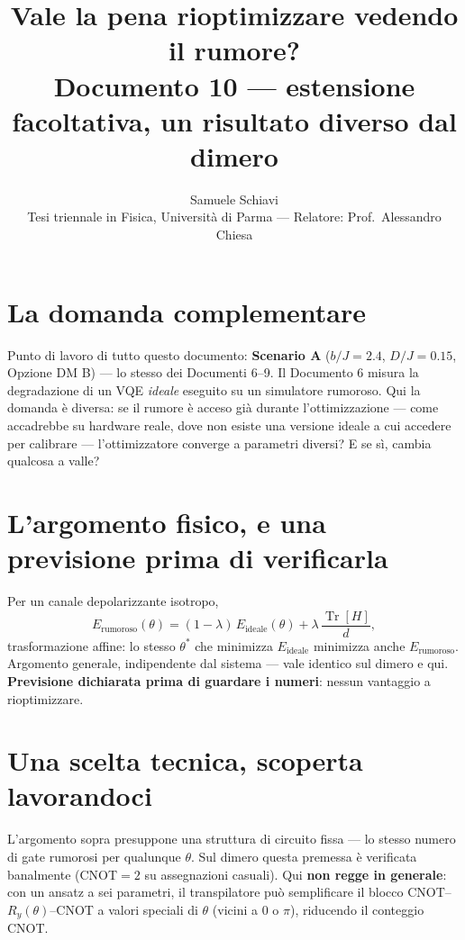 \documentclass[11pt,a4paper]{article}
\title{\bfseries Vale la pena rioptimizzare vedendo il rumore?\\[2pt]
\large Documento 10 --- estensione facoltativa, un risultato diverso dal dimero}
\author{Samuele Schiavi \\ \small Tesi triennale in Fisica, Università di Parma
--- Relatore: Prof.\ Alessandro Chiesa}
\date{}
\providecommand{\Tr}{\operatorname{Tr}}
\begin{document}
\maketitle
\thispagestyle{fancy}

\section{La domanda complementare}

Punto di lavoro di tutto questo documento: \textbf{Scenario A} ($b/J=2.4$,
$D/J=0.15$, Opzione DM B) --- lo stesso dei Documenti 6--9. Il Documento 6
misura la degradazione di un VQE \emph{ideale} eseguito su
un simulatore rumoroso. Qui la domanda è diversa: se il rumore è acceso già
durante l'ottimizzazione --- come accadrebbe su hardware reale, dove non
esiste una versione ideale a cui accedere per calibrare --- l'ottimizzatore
converge a parametri diversi? E se sì, cambia qualcosa a valle?


\section{L'argomento fisico, e una previsione prima di verificarla}

Per un canale depolarizzante isotropo,
$$E_\text{rumoroso}(\theta) = (1-\lambda)\,E_\text{ideale}(\theta) + \lambda\,\frac{\Tr[H]}{d},$$
trasformazione affine: lo stesso $\theta^*$ che minimizza $E_\text{ideale}$
minimizza anche $E_\text{rumoroso}$. Argomento generale, indipendente dal
sistema --- vale identico sul dimero e qui. \textbf{Previsione dichiarata
prima di guardare i numeri}: nessun vantaggio a rioptimizzare.

\section{Una scelta tecnica, scoperta lavorandoci}

L'argomento sopra presuppone una struttura di circuito fissa --- lo stesso
numero di gate rumorosi per qualunque $\theta$. Sul dimero questa premessa
è verificata banalmente (CNOT$=2$ su assegnazioni casuali). Qui \textbf{non
regge in generale}: con un ansatz a sei parametri, il transpilatore può
semplificare il blocco CNOT--$R_y(\theta)$--CNOT a valori speciali di
$\theta$ (vicini a $0$ o $\pi$), riducendo il conteggio CNOT.
\end{document}
